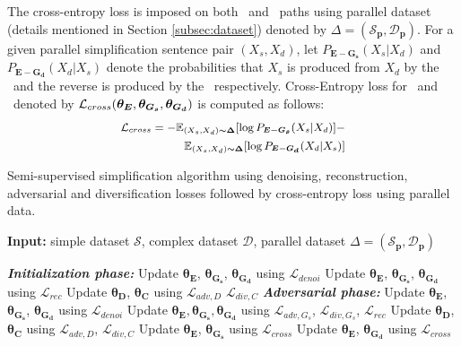 \documentclass[11pt,a4paper]{article}
\begin{document}
The cross-entropy loss is imposed on both \simplf\ and \compl\ paths using parallel dataset (details mentioned in Section \ref{subsec:dataset}) denoted by $\Delta = (\boldsymbol{\mathcal{S}_p}, \boldsymbol{\mathcal{D}_p})$.
For a given parallel simplification sentence pair $(X_s,X_d)$,
let $P_{\boldsymbol{E-G_s}}({X_s}|{X_d})$ and $P_{\boldsymbol{E-G_d}}(X_d|X_s)$ denote the probabilities that $X_s$ is produced from $X_d$  by the \simplf\ and the reverse is produced by the \compl\ respectively. Cross-Entropy loss for \simplf\ and \compl\ denoted by $\mathcal{L}_{cross}(\boldsymbol{\theta_E},\boldsymbol{\theta_{G_s}},\boldsymbol{\theta_{G_d}})$ is computed as follows:
\begin{align}
\small
 \mathcal{L}_{cross} = -\mathbb{E}_{(X_s,X_d)\boldsymbol{ \sim  \Delta}}[\log{P_{\boldsymbol{E-G_s}}(X_s|X_d)}] - \nonumber \\
\small
 \mathbb{E}_{(X_s,X_d)\boldsymbol{ \sim  \Delta}}[\log{P_{\boldsymbol{E-G_d}}(X_d|X_s)}]
\label{eqn:reconst}
\end{align}

\begin{algorithm}[h]
\caption{Semi-supervised simplification algorithm using denoising, reconstruction, adversarial and diversification losses followed by cross-entropy loss using parallel data. }
\label{algo:algo2}
\textbf{Input:} simple dataset $\boldsymbol{\mathcal{{S}}}$, complex dataset $\boldsymbol{\mathcal{{D}}}$, parallel dataset $\Delta = (\boldsymbol{\mathcal{S}_p}, \boldsymbol{\mathcal{D}_p})$
\begin{algorithmic}
\State \textbf{\textit{Initialization phase:}}
\Repeat
\State Update $\boldsymbol{\theta_E}$, $\boldsymbol{\theta_{G_s}}$, $\boldsymbol{\theta_{G_d}}$ using $\mathcal{L}_{denoi}$
\State Update $\boldsymbol{\theta_E}$, $\boldsymbol{\theta_{G_s}}$, $\boldsymbol{\theta_{G_d}}$ using $\mathcal{L}_{rec}$
\State Update $\boldsymbol{\theta_D}$, $\boldsymbol{\theta_C}$ using $\mathcal{L}_{adv,D}$ $\mathcal{L}_{div,C}$
\State \textbf{\textit{Adversarial phase:}}
\Repeat
\State Update $\boldsymbol{\theta_E}$, $\boldsymbol{\theta_{G_s}}$, $\boldsymbol{\theta_{G_d}}$ using $\mathcal{L}_{denoi}$
\State Update $\boldsymbol{\theta_E},\boldsymbol{\theta_{G_s}},\boldsymbol{\theta_{G_d}}$ using $\mathcal{L}_{adv,G_s}$, $\mathcal{L}_{div,G_s}$, $\mathcal{L}_{rec}$
\State Update $\boldsymbol{\theta_D}$, $\boldsymbol{\theta_C}$ using $\mathcal{L}_{adv,D}$, $\mathcal{L}_{div,C}$
\State Update $\boldsymbol{\theta_E}$, $\boldsymbol{\theta_{G_s}}$ using $\mathcal{L}_{cross}$
\State Update $\boldsymbol{\theta_E}$, $\boldsymbol{\theta_{G_d}}$ using $\mathcal{L}_{cross}$
\end{algorithmic}
\end{algorithm}
\end{document}
